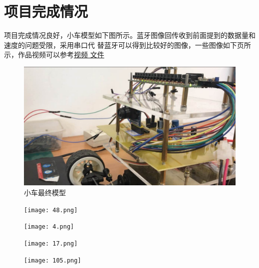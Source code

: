 \documentclass[a4paper]{paper}
\begin{document}
\section{项目完成情况}
项目完成情况良好，小车模型如下图所示。蓝牙图像回传收到前面提到的数据量和速度的问题受限，采用串口代
替蓝牙可以得到比较好的图像，一些图像如下页所示，作品视频可以参考\href{final.mp4}{\underline{视频
文件}}
\begin{figure}[h]
    \centering
    \includegraphics[width=\textwidth]{car.jpg}
    \caption{小车最终模型}
\end{figure}
\clearpage
\vspace{5ex}
\begin{multicols}{2}
    \begin{figure}[H]
        \centering
        \texttt{[image: 48.png]}
    \end{figure}
    \begin{figure}[H]
        \centering
        \texttt{[image: 4.png]}
    \end{figure}
\end{multicols}
\vspace{5ex}
\begin{multicols}{2}
    \begin{figure}[H]
        \centering
        \texttt{[image: 17.png]}
    \end{figure}
    \begin{figure}[H]
        \centering
        \texttt{[image: 105.png]}
    \end{figure}
\end{multicols}
\end{document}
